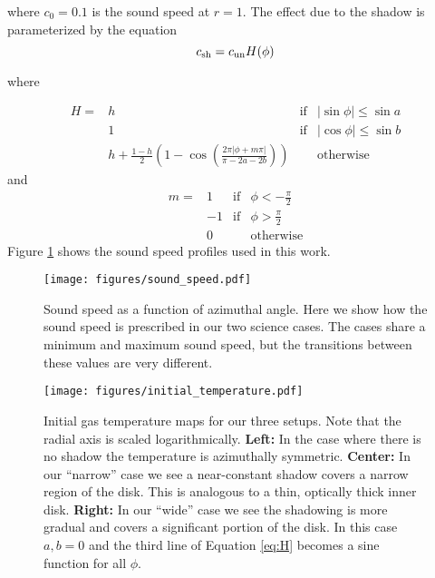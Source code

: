 \documentclass[twocolumn]{aastex631}
\begin{document}
where $c_0 = 0.1$ is the sound speed at $r=1$. The effect due to the shadow is parameterized by the equation
\begin{equation}
    c_{\rm sh} = c_{\rm un} H(\phi)
\end{equation}

where 

\begin{equation*}
    \label{eq:H}
    \begin{array}{cccc}
        H = & h & \text{if} & |\sin{\phi}| \le \sin{a}  \\
            & 1 & \text{if} & |\cos{\phi}| \le \sin{b} \\
            & h + \frac{1-h}{2} \left (  1-\cos{\left ( \frac{2 \pi | \phi + m\pi |}{\pi - 2a - 2b}  \right )  } \right ) & & \text{otherwise}
    \end{array}
\end{equation*}
and
\begin{equation}
    \begin{array}{cccc}
        m = & 1 & \text{if} & \phi < -\frac{\pi}{2} \\
            & -1 & \text{if} & \phi > \frac{\pi}{2} \\
            & 0 & & \text{otherwise}
    \end{array}
\end{equation}
Figure \ref{fig:cs} shows the sound speed profiles used in this work.

\begin{figure}
    \begin{center}
        \texttt{[image: figures/sound\_speed.pdf]}
        \caption{Sound speed as a function of azimuthal angle. Here we show how the sound speed is prescribed in our two science cases. The cases
        share a minimum and maximum sound speed, but the transitions between these values are very different.}    
    \end{center}
    \label{fig:cs}
\end{figure}


\begin{figure*}
    \texttt{[image: figures/initial\_temperature.pdf]}
    \caption{Initial gas temperature maps for our three setups. Note that the radial axis is scaled logarithmically. {\bf Left:} In the case where there is no shadow the temperature is azimuthally symmetric.
    {\bf Center:} In our ``narrow'' case we see a near-constant shadow covers a narrow region of the disk. This is analogous to a thin, optically thick inner disk.
    {\bf Right:} In our ``wide'' case we see the shadowing is more gradual and covers a significant portion of the disk. In this case $a,b=0$ and the third line of
    Equation \ref{eq:H} becomes a sine function for all $\phi$.
    }
    \label{fig:setup}
\end{figure*}
\end{document}
